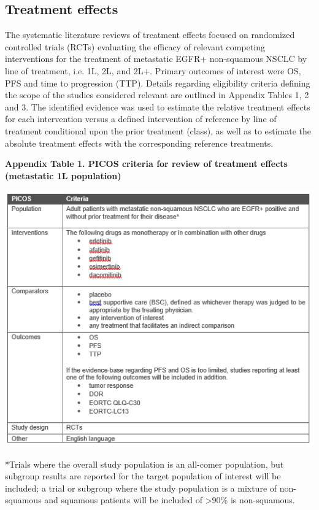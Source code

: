 \documentclass[11pt,final,fleqn]{article}\usepackage[]{graphicx}\usepackage[]{color}
\theoremstyle{plain}
\begin{document}
{\begin{appendices}
\subsection{Treatment effects}

The systematic literature reviews of treatment effects focused on randomized controlled trials (RCTs) evaluating the efficacy of relevant competing interventions for the treatment of metastatic EGFR+ non-squamous NSCLC by line of treatment, i.e. 1L, 2L, and 2L+. Primary outcomes of interest were OS, PFS and time to progression (TTP). Details regarding eligibility criteria defining the scope of the studies considered relevant are outlined in Appendix Tables 1, 2 and 3. The identified evidence was used to estimate the relative treatment effects for each intervention versus a defined intervention of reference by line of treatment conditional upon the prior treatment (class), as well as to estimate the absolute treatment effects with the corresponding reference treatments.

\textbf{Appendix Table 1. PICOS criteria for review of treatment effects (metastatic 1L population)}

\includegraphics[scale=1]{Appendix Table 1.PNG} 

*Trials where the overall study population is an all-comer population, but subgroup results are reported for the target population of interest will be included; a trial or subgroup where the study population is a mixture of non-squamous and squamous  patients will be included of >90\% is non-squamous.


\end{appendices}}
\end{document}
